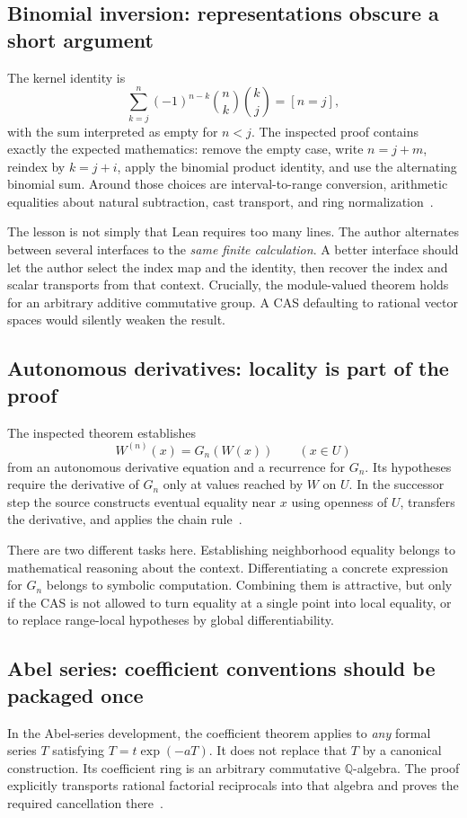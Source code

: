 \documentclass[11pt,a4paper]{article}
\newcommand{\Q}{\mathbb Q}
\theoremstyle{definition}
\theoremstyle{remark}
\begin{document}
\subsection{Binomial inversion: representations obscure a short argument}
The kernel identity is
\begin{equation}\label{eq:orth}
\sum_{k=j}^{n}(-1)^{n-k}\binom nk\binom kj=[n=j],
\end{equation}
with the sum interpreted as empty for $n<j$. The inspected proof contains exactly the expected mathematics: remove the empty case, write $n=j+m$, reindex by $k=j+i$, apply the binomial product identity, and use the alternating binomial sum. Around those choices are interval-to-range conversion, arithmetic equalities about natural subtraction, cast transport, and ring normalization~\cite{binomial}.

The lesson is not simply that Lean requires too many lines. The author alternates between several interfaces to the \emph{same finite calculation}. A better interface should let the author select the index map and the identity, then recover the index and scalar transports from that context. Crucially, the module-valued theorem holds for an arbitrary additive commutative group. A CAS defaulting to rational vector spaces would silently weaken the result.

\subsection{Autonomous derivatives: locality is part of the proof}
The inspected theorem establishes
\[
W^{(n)}(x)=G_n(W(x))\qquad(x\in U)
\]
from an autonomous derivative equation and a recurrence for $G_n$. Its hypotheses require the derivative of $G_n$ only at values reached by $W$ on $U$. In the successor step the source constructs eventual equality near $x$ using openness of $U$, transfers the derivative, and applies the chain rule~\cite{ode}.

There are two different tasks here. Establishing neighborhood equality belongs to mathematical reasoning about the context. Differentiating a concrete expression for $G_n$ belongs to symbolic computation. Combining them is attractive, but only if the CAS is not allowed to turn equality at a single point into local equality, or to replace range-local hypotheses by global differentiability.

\subsection{Abel series: coefficient conventions should be packaged once}
In the Abel-series development, the coefficient theorem applies to \emph{any} formal series $T$ satisfying $T=t\exp(-aT)$. It does not replace that $T$ by a canonical construction. Its coefficient ring is an arbitrary commutative $\Q$-algebra. The proof explicitly transports rational factorial reciprocals into that algebra and proves the required cancellation there~\cite{abel}.
\end{document}
